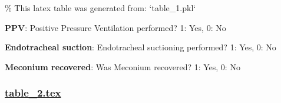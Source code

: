 \documentclass[11pt]{article}
\begin{document}
\begin{codeoutput}
\% This latex table was generated from: `table\_1.pkl`
\begin{table}[h]
\caption{Association between treatments and change in policy using Chi-square test}
\label{table:association\_tests}
\begin{threeparttable}
\renewcommand{\TPTminimum}{\linewidth}
\begin{tablenotes}
\footnotesize
\item \textbf{PPV}: Positive Pressure Ventilation performed?
1: Yes, 0: No
\item \textbf{Endotracheal suction}: Endotracheal suctioning performed?
1: Yes, 0: No
\item \textbf{Meconium recovered}: Was Meconium recovered?
1: Yes, 0: No
\end{tablenotes}
\end{threeparttable}
\end{table}
\end{codeoutput}

\subsubsection*{\hyperlink{code-LaTeX Table Design-table-2-tex}{table\_2.tex}}
\end{document}
